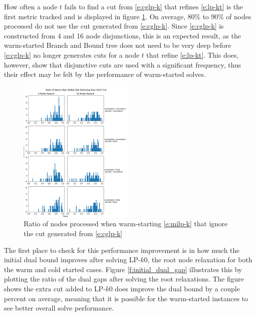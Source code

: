 \documentclass[10pt]{article}
\begin{document}
	How often a node $ t $ fails to find a cut from \ref{e:cglp-k} that refines \ref{e:lp-kt} is the first metric tracked and is displayed in figure \ref{f:cglp_usage}. On average, 80\% to 90\% of nodes processed do not use the cut generated from \ref{e:cglp-k}. Since \ref{e:cglp-k} is constructed from 4 and 16 node disjunctions, this is an expected result, as the warm-started Branch and Bound tree does not need to be very deep before \ref{e:cglp-k} no longer generates cuts for a node $ t $ that refine \ref{e:lp-kt}. This does, however, show that disjunctive cuts are used with a significant frequency, thus their effect may be felt by the performance of warm-started solves.
	
	\begin{figure}[h]
		\centering
		\includegraphics[width=0.5\textwidth]{Ratio of Warm Start Nodes Not Selecting Own CGLP Cut.png}
		\caption{Ratio of nodes processed when warm-starting \ref{e:milp-k} that ignore the cut generated from \ref{e:cglp-k}}
		\label{f:cglp_usage}
	\end{figure} 
	
	The first place to check for this performance improvement is in how much the initial dual bound improves after solving LP-$ k0 $, the root node relaxation for both the warm and cold started cases. Figure \ref{f:initial_dual_gap} illustrates this by plotting the ratio of the dual gaps after solving the root relaxations. The figure shows the extra cut added to LP-$ k0 $ does improve the dual bound by a couple percent on average, meaning that it is possible for the warm-started instances to see better overall solve performance.
	
\end{document}

